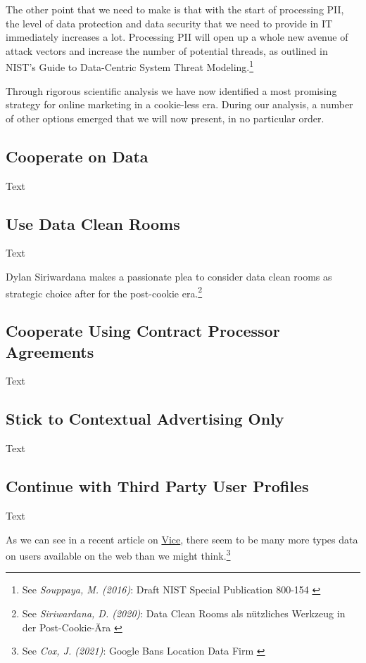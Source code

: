 The other point that we need to make is that with the start of processing PII, the level of data protection and data security that we need to provide in IT immediately increases a lot. Processing PII will open up a whole new avenue of attack vectors and increase the number of potential threads, as outlined in NIST's Guide to Data-Centric System Threat Modeling.\footnote{See \textit{Souppaya, M. (2016)}: Draft NIST Special Publication 800-154 \cite{sp800_154_draft}}

Through rigorous scientific analysis we have now identified a most promising strategy for online marketing in a cookie-less era. During our analysis, a number of other options emerged that we will now present, in no particular order.

\subsection{Cooperate on Data}

Text

\subsection{Use Data Clean Rooms}

Text

Dylan Siriwardana makes a passionate plea to consider data clean rooms as strategic choice after for the post-cookie era.\footnote{See \textit{Siriwardana, D. (2020)}: Data Clean Rooms als nützliches Werkzeug in der Post-Cookie-Ära \cite{dataClean}}

\subsection{Cooperate Using Contract Processor Agreements}

Text

\subsection{Stick to Contextual Advertising Only}

Text

\subsection{Continue with Third Party User Profiles}

Text

As we can see in a recent article on \href{https://www.vice.com/en}{Vice}, there seem to be many more types data on users available on the web than we might think.\footnote{See \textit{Cox, J. (2021)}: Google Bans Location Data Firm \cite{dataClean}}
